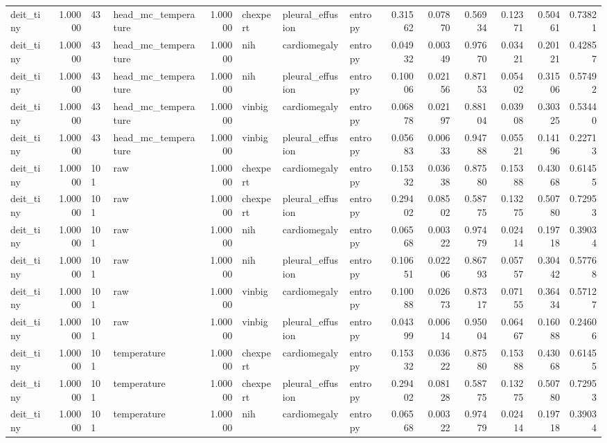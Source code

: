 \begin{tabular}{lrllrlllrrrrrr}
deit\_tiny & 1.00000 & 43 & head\_mc\_temperature & 1.00000 & chexpert & pleural\_effusion & entropy & 0.31562 & 0.07870 & 0.56934 & 0.12371 & 0.50461 & 0.73821 \\
deit\_tiny & 1.00000 & 43 & head\_mc\_temperature & 1.00000 & nih & cardiomegaly & entropy & 0.04932 & 0.00349 & 0.97670 & 0.03421 & 0.20121 & 0.42857 \\
deit\_tiny & 1.00000 & 43 & head\_mc\_temperature & 1.00000 & nih & pleural\_effusion & entropy & 0.10006 & 0.02156 & 0.87153 & 0.05402 & 0.31506 & 0.57492 \\
deit\_tiny & 1.00000 & 43 & head\_mc\_temperature & 1.00000 & vinbig & cardiomegaly & entropy & 0.06878 & 0.02197 & 0.88104 & 0.03908 & 0.30325 & 0.53440 \\
deit\_tiny & 1.00000 & 43 & head\_mc\_temperature & 1.00000 & vinbig & pleural\_effusion & entropy & 0.05683 & 0.00633 & 0.94788 & 0.05521 & 0.14196 & 0.22713 \\
deit\_tiny & 1.00000 & 101 & raw & 1.00000 & chexpert & cardiomegaly & entropy & 0.15332 & 0.03638 & 0.87580 & 0.15388 & 0.43068 & 0.61455 \\
deit\_tiny & 1.00000 & 101 & raw & 1.00000 & chexpert & pleural\_effusion & entropy & 0.29402 & 0.08502 & 0.58775 & 0.13275 & 0.50780 & 0.72953 \\
deit\_tiny & 1.00000 & 101 & raw & 1.00000 & nih & cardiomegaly & entropy & 0.06568 & 0.00322 & 0.97479 & 0.02414 & 0.19718 & 0.39034 \\
deit\_tiny & 1.00000 & 101 & raw & 1.00000 & nih & pleural\_effusion & entropy & 0.10651 & 0.02206 & 0.86793 & 0.05757 & 0.30442 & 0.57768 \\
deit\_tiny & 1.00000 & 101 & raw & 1.00000 & vinbig & cardiomegaly & entropy & 0.10088 & 0.02673 & 0.87317 & 0.07155 & 0.36434 & 0.57127 \\
deit\_tiny & 1.00000 & 101 & raw & 1.00000 & vinbig & pleural\_effusion & entropy & 0.04399 & 0.00614 & 0.95004 & 0.06467 & 0.16088 & 0.24606 \\
deit\_tiny & 1.00000 & 101 & temperature & 1.00000 & chexpert & cardiomegaly & entropy & 0.15332 & 0.03622 & 0.87580 & 0.15388 & 0.43068 & 0.61455 \\
deit\_tiny & 1.00000 & 101 & temperature & 1.00000 & chexpert & pleural\_effusion & entropy & 0.29402 & 0.08128 & 0.58775 & 0.13275 & 0.50780 & 0.72953 \\
deit\_tiny & 1.00000 & 101 & temperature & 1.00000 & nih & cardiomegaly & entropy & 0.06568 & 0.00322 & 0.97479 & 0.02414 & 0.19718 & 0.39034 \\

\end{tabular}
